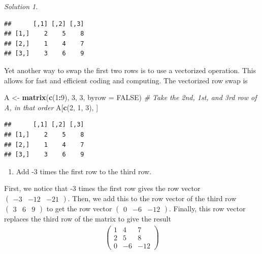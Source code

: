 \documentclass[
]{book}
\newenvironment{Shaded}{\begin{snugshade}}{\end{snugshade}}
\newcommand{\CommentTok}[1]{\textcolor[rgb]{0.56,0.35,0.01}{\textit{#1}}}
\newcommand{\DataTypeTok}[1]{\textcolor[rgb]{0.13,0.29,0.53}{#1}}
\newcommand{\DecValTok}[1]{\textcolor[rgb]{0.00,0.00,0.81}{#1}}
\newcommand{\KeywordTok}[1]{\textcolor[rgb]{0.13,0.29,0.53}{\textbf{#1}}}
\newcommand{\NormalTok}[1]{#1}
\newcommand{\OperatorTok}[1]{\textcolor[rgb]{0.81,0.36,0.00}{\textbf{#1}}}
\newcommand{\OtherTok}[1]{\textcolor[rgb]{0.56,0.35,0.01}{#1}}
\newcommand{\StringTok}[1]{\textcolor[rgb]{0.31,0.60,0.02}{#1}}
\providecommand{\tightlist}{%
  \setlength{\itemsep}{0pt}\setlength{\parskip}{0pt}}
\theoremstyle{definition}
\theoremstyle{definition}
\theoremstyle{definition}
\theoremstyle{definition}
\theoremstyle{remark}
\newtheorem*{solution}{Solution}
\begin{document}
\begin{solution}
\begin{verbatim}
##      [,1] [,2] [,3]
## [1,]    2    5    8
## [2,]    1    4    7
## [3,]    3    6    9
\end{verbatim}

Yet another way to swap the first two rows is to use a vectorized operation. This allows for fast and efficient coding and computing. The vectorized row swap is

\begin{Shaded}
\begin{Highlighting}[]
\NormalTok{A <-}\StringTok{ }\KeywordTok{matrix}\NormalTok{(}\KeywordTok{c}\NormalTok{(}\DecValTok{1}\OperatorTok{:}\DecValTok{9}\NormalTok{), }\DecValTok{3}\NormalTok{, }\DecValTok{3}\NormalTok{, }\DataTypeTok{byrow =} \OtherTok{FALSE}\NormalTok{)}
\CommentTok{# Take the 2nd, 1st, and 3rd row of A, in that order}
\NormalTok{A[}\KeywordTok{c}\NormalTok{(}\DecValTok{2}\NormalTok{, }\DecValTok{1}\NormalTok{, }\DecValTok{3}\NormalTok{), ]}
\end{Highlighting}
\end{Shaded}

\begin{verbatim}
##      [,1] [,2] [,3]
## [1,]    2    5    8
## [2,]    1    4    7
## [3,]    3    6    9
\end{verbatim}

\begin{enumerate}
\def\labelenumi{\arabic{enumi})}
\setcounter{enumi}{1}
\tightlist
\item
  Add -3 times the first row to the third row.
\end{enumerate}

First, we notice that -3 times the first row gives the row vector \(\begin{pmatrix} -3 & -12 & -21 \end{pmatrix}\). Then, we add this to the row vector of the third row \(\begin{pmatrix} 3 & 6 & 9 \end{pmatrix}\) to get the row vector \(\begin{pmatrix} 0 & -6 & -12 \end{pmatrix}\). Finally, this row vector replaces the third row of the matrix to give the result
\[
\begin{aligned}
\begin{pmatrix} 1 & 4 & 7 \\ 2 & 5 & 8 \\ 0 & -6 & -12 \end{pmatrix}
\end{aligned}
\]


\end{solution}
\end{document}
